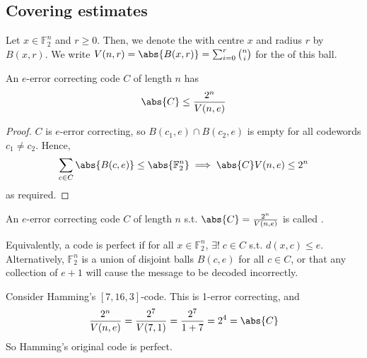 \subsection{Covering estimates}
\begin{definition}
    Let $x \in \mathbb F_2^n$ and $r \geq 0$.
    Then, we denote the  with centre $x$ and radius $r$ by $B(x,r)$.
    We write $V(n,r) = \abs{B(x,r)} = \sum_{i=0}^r \binom{n}{i}$ for the  of this ball.
\end{definition}

\begin{lemma}
    An $e$-error correcting code $C$ of length $n$ has
    \begin{align*}
        \abs{C} \leq \frac{2^n}{V(n,e)}
    \end{align*}
\end{lemma}

\begin{proof}
    $C$ is $e$-error correcting, so $B(c_1, e) \cap B(c_2, e)$ is empty for all codewords $c_1 \neq c_2$.
    Hence,
    \begin{align*}
        \sum_{c \in C} \abs{B(c,e)}  \leq \abs{\mathbb F_2^n} \implies \abs{C} V(n,e) \leq 2^n
    \end{align*}
    as required.
\end{proof}

\begin{definition}
    An $e$-error correcting code $C$ of length $n$ s.t. $\abs{C} = \frac{2^n}{V(n,e)}$ is called .
\end{definition}

\begin{remark}
    Equivalently, a code is perfect if for all $x \in \mathbb F_2^n$, $\exists! \; c \in C$ s.t. $d(x,c) \leq e$.
    Alternatively, $\mathbb F_2^n$ is a union of disjoint balls $B(c,e)$ for all $c \in C$, or that any collection of $e + 1$ will cause the message to be decoded incorrectly.
\end{remark}

\begin{example}
    Consider Hamming's $[7,16,3]$-code.
    This is 1-error correcting, and
    \begin{align*}
        \frac{2^n}{V(n,e)} = \frac{2^7}{V(7,1)} = \frac{2^7}{1+7} = 2^4 = \abs{C}
    \end{align*}
    So Hamming's original code is perfect.
\end{example}

